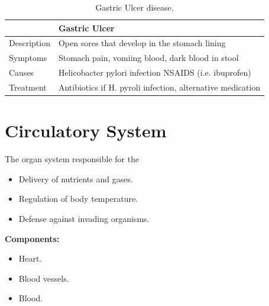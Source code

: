 \documentclass[12pt]{report}
\begin{document}
\begin{table}[h!]
    \renewcommand{\arraystretch}{1.5}
    \setlength{\tabcolsep}{10pt}
    \setlength{\arrayrulewidth}{0.25mm}

    \begin{center}
        \vspace{0.5em}
    \begin{tabular}{|l|l|}
        \hline
         & Gastric Ulcer \\ 
        \hline
        Description & Open sores that develop in the stomach lining \\
        \hline
        Symptoms & Stomach pain, vomiing blood, dark blood in stool\\ 
        \hline 
        Causes & Helicobacter pylori infection NSAIDS (i.e. ibuprofen)\\ 
        \hline
        Treatment & Antibiotics if H. pyroli infection, alternative medication\\ 
        \hline
        \end{tabular}
    \end{center}
    \caption{Gastric Ulcer disease.}
\end{table}

\section{Circulatory System}
\begin{definition}
    The organ system responsible for the 
    \begin{itemize}
        \item{Delivery of nutrients and gases.}
        \item{Regulation of body temperature.}
        \item{Defense against invading organisms.}
    \end{itemize}
    \textbf{Components:}
    \begin{itemize}
        \item{Heart.}
        \item{Blood vessels.}
        \item{Blood.}
    \end{itemize}
\end{definition}
\end{document}
